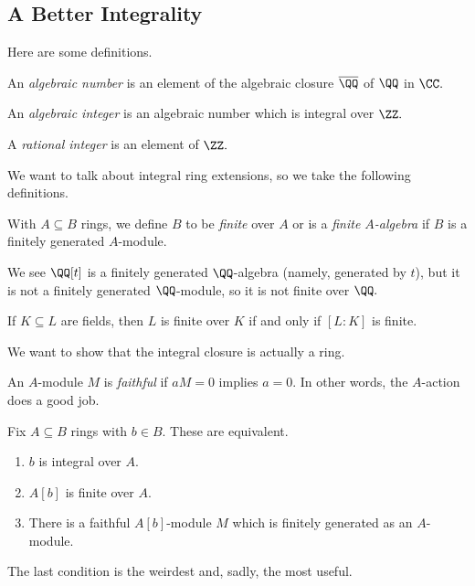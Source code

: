 \documentclass[../notes.tex]{subfiles}
\begin{document}
\subsection{A Better Integrality}
Here are some definitions.
\begin{defi}
    An \textit{algebraic number} is an element of the algebraic closure $\overline\QQ$ of $\QQ$ in $\CC.$
\end{defi}
\begin{defi}
    An \textit{algebraic integer} is an algebraic number which is integral over $\ZZ.$
\end{defi}
\begin{defi}
    A \textit{rational integer} is an element of $\ZZ.$
\end{defi}
We want to talk about integral ring extensions, so we take the following definitions.
\begin{defi}[Finite]
    With $A\subseteq B$ rings, we define $B$ to be \textit{finite} over $A$ or is a \textit{finite $A$-algebra} if $B$ is a finitely generated $A$-module.
\end{defi}
\begin{ex}
    We see $\QQ[t]$ is a finitely generated $\QQ$-algebra (namely, generated by $t$), but it is not a finitely generated $\QQ$-module, so it is not finite over $\QQ.$
\end{ex}
\begin{ex}
    If $K\subseteq L$ are fields, then $L$ is finite over $K$ if and only if $[L:K]$ is finite.
\end{ex}
We want to show that the integral closure is actually a ring.
\begin{defi}[Faithful]
    An $A$-module $M$ is \textit{faithful} if $aM=0$ implies $a=0.$ In other words, the $A$-action does a good job.
\end{defi}
\begin{prop}
    Fix $A\subseteq B$ rings with $b\in B.$ These are equivalent.
    \begin{enumerate}[label=(\alph*)]
        \item $b$ is integral over $A.$
        \item $A[b]$ is finite over $A.$
        \item There is a faithful $A[b]$-module $M$ which is finitely generated as an $A$-module.
    \end{enumerate}
\end{prop}
The last condition is the weirdest and, sadly, the most useful.
\end{document}

